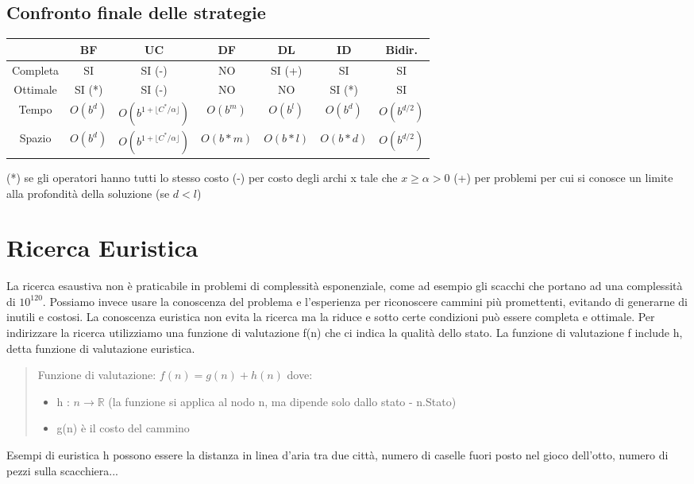 \documentclass{article}
\begin{document}
\subsection{Confronto finale delle strategie}
\begin{table} [H]
    \centering
    \begin{tabular}{|c|c|c|c|c|c|c|}
        \hline
                    & BF        & UC                                        & DF        & DL        & ID        & Bidir. \\ \hline
        Completa    & SI        & SI (-)                                    & NO        & SI (+)    & SI        & SI \\ 
        Ottimale    & SI (*)    & SI (-)                                    & NO        & NO        & SI (*)    & SI \\ 
        Tempo       & $O(b^d)$  & $O(b^{1+ \lfloor C^*/\alpha \rfloor})$    & $O(b^m)$  & $O(b^l)$  & $O(b^d)$  & $O(b^{d/2})$\\ 
        Spazio      & $O(b^d)$  & $O(b^{1+ \lfloor C^*/\alpha \rfloor})$    & $O(b*m)$  & $O(b*l)$  & $O(b*d)$  & $O(b^{d/2})$ \\
        \hline
    \end{tabular}
\end{table}
(*) se gli operatori hanno tutti lo stesso costo \newline
(-) per costo degli archi x tale che $ x \geq \alpha > 0$ \newline
(+) per problemi per cui si conosce un limite alla profondità della soluzione (se $d<l$)

\section{Ricerca Euristica}
La ricerca esaustiva non è praticabile in problemi di complessità esponenziale, come ad esempio gli scacchi che portano ad una complessità di $10^{120}$. Possiamo invece usare la conoscenza del problema e l'esperienza per riconoscere cammini più promettenti, evitando di generarne di inutili e costosi. La conoscenza euristica non evita la ricerca ma la riduce e sotto certe condizioni può essere completa e ottimale. \newline 
Per indirizzare la ricerca utilizziamo una funzione di valutazione f(n) che ci indica la qualità dello stato. La funzione di valutazione f include h, detta funzione di valutazione euristica.
\begin{quote}
    Funzione di valutazione: $f(n) = g(n) + h(n)$ dove: 
    \begin{itemize}
        \item h : $n \rightarrow \mathbb{R}$ (la funzione si applica al nodo n, ma dipende solo dallo stato - n.Stato)
        \item g(n) è il costo del cammino
    \end{itemize}
\end{quote}
Esempi di euristica h possono essere la distanza in linea d'aria tra due città, numero di caselle fuori posto nel gioco dell'otto, numero di pezzi sulla scacchiera...
\end{document}
